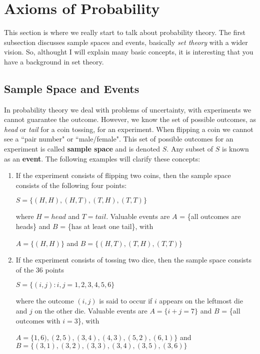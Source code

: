 \documentclass[a4paper,twocolumn]{article}
\begin{document}
\section{Axioms of Probability}
\label{sec:axioms}

This section is where we really start to talk about probability theory. The first subsection discusses sample spaces and events, basically \textit{set theory} with a wider vision. So, althought I will explain many basic concepts, it is interesting that you have a background in set theory.

\subsection{Sample Space and Events}

In probability theory we deal with problems of uncertainty, with experiments we cannot guarantee the outcome. However, we know the set of possible outcomes, as \textit{head} or \textit{tail} for a coin tossing, for an experiment. When flipping a coin we cannot see a ``pair number" or ``male/female". This set of possible outcomes for an experiment is called \textbf{sample space} and is denoted $S$. Any subset of $S$ is known as an \textbf{event}. The following examples will clarify these concepts:

\begin{enumerate}
    \item If the experiment consists of flipping two coins, then the sample space consists of the following four points:
    \begin{center}
    $S = \{(H,H),(H,T),(T,H),(T,T)\}$
    \end{center}
    where $H = head$ and $T = tail$. Valuable events are $A$ = \{all outcomes are heads\} and $B$ = \{has at least one tail\}, with
    \begin{center}
    $A = \{(H,H)\}$ and $B = \{(H,T),(T,H),(T,T)\}$
    \end{center}

    \item If the experiment consists of tossing two dice, then the sample space consists of the 36 points
    \begin{center}
    $S = \{(i, j): i, j = 1, 2, 3, 4, 5, 6\}$
    \end{center}
    where the outcome $(i, j)$ is said to occur if $i$ appears on the leftmost die and $j$ on the other die. Valuable events are $A = \{i + j = 7\}$ and $B$ = \{all outcomes with $i = 3$\}, with
    \begin{center}
    $A = \{1,6),(2,5),(3,4),(4,3),(5,2),(6,1)\}$ and $B = \{(3,1),(3,2),(3,3),(3,4),(3,5),(3,6)\}$
    \end{center}
\end{enumerate}
\end{document}

